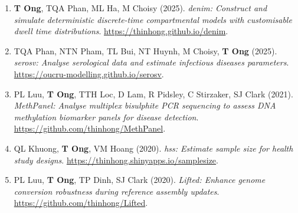 \documentclass[
  12pt,
  a4paper,
]{article}
\providecommand{\tightlist}{%
  \setlength{\itemsep}{0pt}\setlength{\parskip}{0pt}}\usepackage{longtable,booktabs,array}
\begin{document}
\begin{enumerate}
\def\labelenumi{\arabic{enumi}.}
\tightlist
\item
  \textbf{T Ong}, TQA Phan, ML Ha, M Choisy (2025). \emph{denim:
  Construct and simulate deterministic discrete-time compartmental
  models with customisable dwell time distributions}.
  \url{https://thinhong.github.io/denim}.
\item
  TQA Phan, NTN Pham, TL Bui, NT Huynh, M Choisy, \textbf{T Ong} (2025).
  \emph{serosv: Analyse serological data and estimate infectious
  diseases parameters}. \url{https://oucru-modelling.github.io/serosv}.
\item
  PL Luu, \textbf{T Ong}, TTH Loc, D Lam, R Pidsley, C Stirzaker, SJ
  Clark (2021). \emph{MethPanel: Analyse multiplex bisulphite PCR
  sequencing to assess DNA methylation biomarker panels for disease
  detection}. \url{https://github.com/thinhong/MethPanel}.
\item
  QL Khuong, \textbf{T Ong}, VM Hoang (2020). \emph{hss: Estimate sample
  size for health study designs}.
  \url{https://thinhong.shinyapps.io/samplesize}.
\item
  PL Luu, \textbf{T Ong}, TP Dinh, SJ Clark (2020). \emph{Lifted:
  Enhance genome conversion robustness during reference assembly
  updates}. \url{https://github.com/thinhong/Lifted}.
\end{enumerate}
\end{document}
